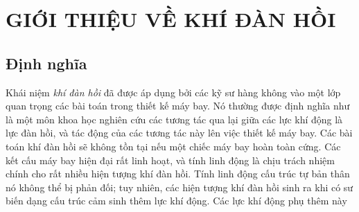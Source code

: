 \documentclass[KHI_DAN_HOI.tex]{subfiles}
\begin{document}
\chapter{GIỚI THIỆU VỀ KHÍ ĐÀN HỒI}
\section{Định nghĩa}
Khái niệm \emph{khí đàn hồi} đã được áp dụng bởi các kỹ sư hàng không vào một lớp quan trọng các bài toán trong thiết kế máy bay. Nó thường được định nghĩa như là một môn khoa học nghiên cứu các tương tác qua lại giữa các lực khí động là lực đàn hồi, và tác động của các tương tác này lên việc thiết kế máy bay. Các bài toán khí đàn hồi sẽ không tồn tại nếu một chiếc máy bay hoàn toàn cứng. Các kết cấu máy bay hiện đại rất linh hoạt, và tính linh động là chịu trách nhiệm chính cho rất nhiều hiện tượng khí đàn hồi. Tính linh động cấu trúc tự bản thân nó không thể bị phản đối; tuy nhiên, các hiện tượng khí đàn hồi sinh ra khi có sư biến dạng cấu trúc cảm sinh thêm lực khí động. Các lực khí động phụ thêm này 
\end{document}
